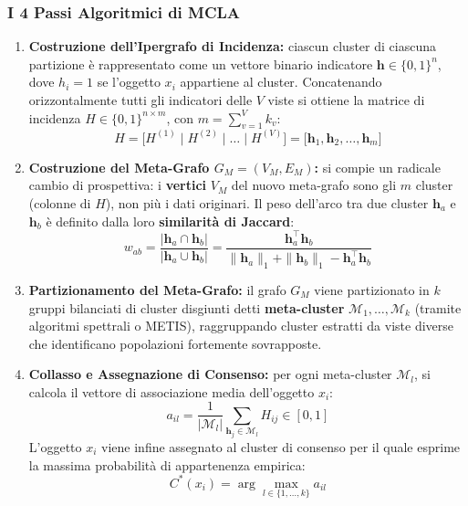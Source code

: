 \FloatBarrier
\subsubsection{I 4 Passi Algoritmici di MCLA}
\begin{enumerate}
    \item \textbf{Costruzione dell'Ipergrafo di Incidenza:} ciascun cluster di ciascuna partizione è rappresentato come un vettore binario indicatore $\mathbf{h} \in \{0, 1\}^n$, dove $h_i = 1$ se l'oggetto $x_i$ appartiene al cluster. Concatenando orizzontalmente tutti gli indicatori delle $V$ viste si ottiene la matrice di incidenza $H \in \{0, 1\}^{n \times m}$, con $m = \sum_{v=1}^V k_v$:
    \begin{equation}
        H = \big[ H^{(1)} \mid H^{(2)} \mid \dots \mid H^{(V)} \big] = \big[ \mathbf{h}_1, \mathbf{h}_2, \dots, \mathbf{h}_m \big]
    \end{equation}
    \item \textbf{Costruzione del Meta-Grafo $G_M = (V_M, E_M)$:} si compie un radicale cambio di prospettiva: i \textbf{vertici} $V_M$ del nuovo meta-grafo sono gli $m$ cluster (colonne di $H$), non più i dati originari. Il peso dell'arco tra due cluster $\mathbf{h}_a$ e $\mathbf{h}_b$ è definito dalla loro \textbf{similarità di Jaccard}:
    \begin{equation}
        w_{ab} = \frac{|\mathbf{h}_a \cap \mathbf{h}_b|}{|\mathbf{h}_a \cup \mathbf{h}_b|} = \frac{\mathbf{h}_a^\top \mathbf{h}_b}{\|\mathbf{h}_a\|_1 + \|\mathbf{h}_b\|_1 - \mathbf{h}_a^\top \mathbf{h}_b}
    \end{equation}
    \item \textbf{Partizionamento del Meta-Grafo:} il grafo $G_M$ viene partizionato in $k$ gruppi bilanciati di cluster disgiunti detti \textbf{meta-cluster} $\mathcal{M}_1, \dots, \mathcal{M}_k$ (tramite algoritmi spettrali o METIS), raggruppando cluster estratti da viste diverse che identificano popolazioni fortemente sovrapposte.
    \item \textbf{Collasso e Assegnazione di Consenso:} per ogni meta-cluster $\mathcal{M}_l$, si calcola il vettore di associazione media dell'oggetto $x_i$:
    \begin{equation}
        a_{il} = \frac{1}{|\mathcal{M}_l|} \sum_{\mathbf{h}_j \in \mathcal{M}_l} H_{ij} \in [0, 1]
    \end{equation}
    L'oggetto $x_i$ viene infine assegnato al cluster di consenso per il quale esprime la massima probabilità di appartenenza empirica:
    \begin{equation}
        C^*(x_i) = \arg\max_{l \in \{1, \dots, k\}} a_{il}
    \end{equation}
\end{enumerate}


